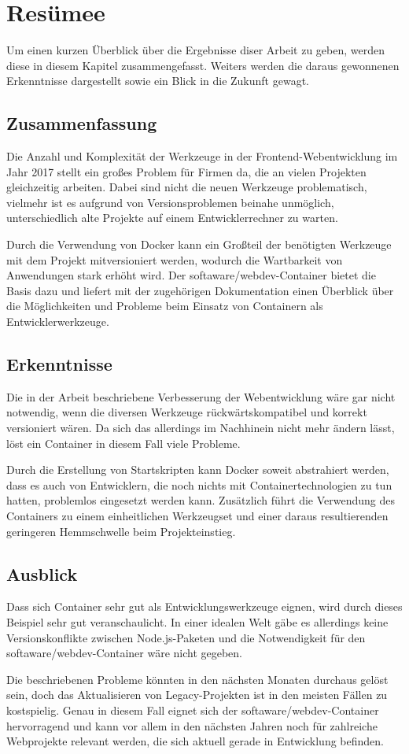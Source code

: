 \chapter{Resümee}
\label{cha:resume}
Um einen kurzen Überblick über die Ergebnisse diser Arbeit zu geben, werden diese in diesem Kapitel zusammengefasst.
Weiters werden die daraus gewonnenen Erkenntnisse dargestellt sowie ein Blick in die Zukunft gewagt.

\section{Zusammenfassung}
\label{sec:summary}
Die Anzahl und Komplexität der Werkzeuge in der Frontend-Webentwicklung im Jahr 2017 stellt ein großes Problem für Firmen da, die an vielen Projekten gleichzeitig arbeiten.
Dabei sind nicht die neuen Werkzeuge problematisch, vielmehr ist es aufgrund von Versionsproblemen beinahe unmöglich, unterschiedlich alte Projekte auf einem Entwicklerrechner zu warten.

Durch die Verwendung von Docker kann ein Großteil der benötigten Werkzeuge mit dem Projekt mitversioniert werden, wodurch die Wartbarkeit von Anwendungen stark erhöht wird.
Der softaware/webdev-Container bietet die Basis dazu und liefert mit der zugehörigen Dokumentation einen Überblick über die Möglichkeiten und Probleme beim Einsatz von Containern als Entwicklerwerkzeuge.

\section{Erkenntnisse}
\label{sec:findings}
Die in der Arbeit beschriebene Verbesserung der Webentwicklung wäre gar nicht notwendig, wenn die diversen Werkzeuge rückwärtskompatibel und korrekt versioniert wären.
Da sich das allerdings im Nachhinein nicht mehr ändern lässt, löst ein Container in diesem Fall viele Probleme.

Durch die Erstellung von Startskripten kann Docker soweit abstrahiert werden, dass es auch von Entwicklern, die noch nichts mit Containertechnologien zu tun hatten, problemlos eingesetzt werden kann.
Zusätzlich führt die Verwendung des Containers zu einem einheitlichen Werkzeugset und einer daraus resultierenden geringeren Hemmschwelle beim Projekteinstieg.

\section{Ausblick}
\label{sec:outlook}
Dass sich Container sehr gut als Entwicklungswerkzeuge eignen, wird durch dieses Beispiel sehr gut veranschaulicht.
In einer idealen Welt gäbe es allerdings keine Versionskonflikte zwischen Node.js-Paketen und die Notwendigkeit für den softaware/webdev-Container wäre nicht gegeben.

Die beschriebenen Probleme könnten in den nächsten Monaten durchaus gelöst sein, doch das Aktualisieren von Legacy-Projekten ist in den meisten Fällen zu kostspielig.
Genau in diesem Fall eignet sich der softaware/webdev-Container hervorragend und kann vor allem in den nächsten Jahren noch für zahlreiche Webprojekte relevant werden, die sich aktuell gerade in Entwicklung befinden.
